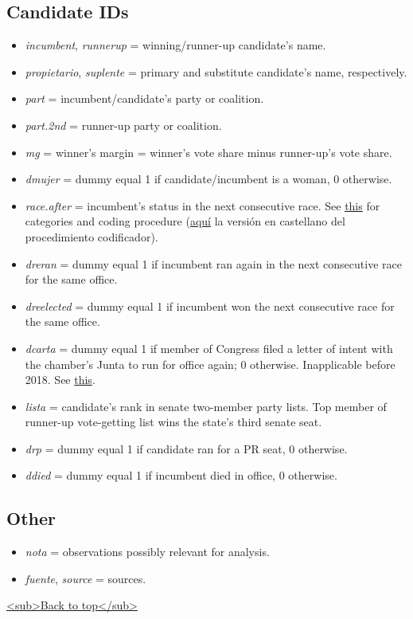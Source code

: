 \documentclass[11pt]{article}
\begin{document}
\subsection{Candidate IDs}
\label{sec:orgcead0a1}
\begin{itemize}
\item \emph{incumbent}, \emph{runnerup} = winning/runner-up candidate's name.
\item \emph{propietario}, \emph{suplente} = primary and substitute candidate's name, respectively.
\item \emph{part} = incumbent/candidate's party or coalition.
\item \emph{part.2nd} = runner-up party or coalition.
\item \emph{mg} = winner's margin = winner's vote share minus runner-up's vote share.
\item \emph{dmujer} = dummy equal 1 if candidate/incumbent is a woman, 0 otherwise.
\item \emph{race.after} = incumbent's status in the next consecutive race. See \hyperref[orgb2d0574]{this} for categories and coding procedure (\hyperref[orgbfd88bb]{aquí} la versión en castellano del procedimiento codificador).
\item \emph{dreran} = dummy equal 1 if incumbent ran again in the next consecutive race for the same office.
\item \emph{dreelected} = dummy equal 1 if incumbent won the next consecutive race for the same office.
\item \emph{dcarta} = dummy equal 1 if member of Congress filed a letter of intent with the chamber's Junta to run for office again; 0 otherwise. Inapplicable before 2018. See \href{http://eleccionconsecutiva.diputados.gob.mx/contendientes}{this}.
\item \emph{lista} = candidate's rank in senate two-member party lists. Top member of runner-up vote-getting list wins the state's third senate seat.
\item \emph{drp} = dummy equal 1 if candidate ran for a PR seat, 0 otherwise.
\item \emph{ddied} = dummy equal 1 if incumbent died in office, 0 otherwise.
\end{itemize}
\subsection{Other}
\label{sec:orgc8acdb9}
\begin{itemize}
\item \emph{nota} = observations possibly relevant for analysis.
\item \emph{fuente}, \emph{source} = sources.
\end{itemize}
\hyperref[org5520298]{<sub>Back to top</sub>}
\end{document}
